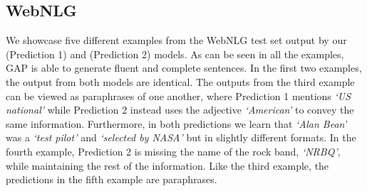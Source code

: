 \documentclass[11pt]{article}
\begin{document}
\subsection{WebNLG}
We showcase five different examples from the WebNLG test set output by our  (Prediction 1) and  (Prediction 2) models. As can be seen in all the examples, GAP is able to generate fluent and complete sentences. In the first two examples, the output from both models are identical. The outputs from the third example can be viewed as paraphrases of one another, where Prediction 1 mentions \textit{`US national'} while Prediction 2 instead uses the adjective \textit{`American'} to convey the same information. Furthermore, in both predictions we learn that \textit{`Alan Bean'} was a \textit{`test pilot'} and \textit{`selected by NASA'} but in slightly different formats. In the fourth example, Prediction 2 is missing the name of the rock band, \textit{`NRBQ'}, while maintaining the rest of the information. Like the third example, the predictions in the fifth example are paraphrases.
\end{document}

